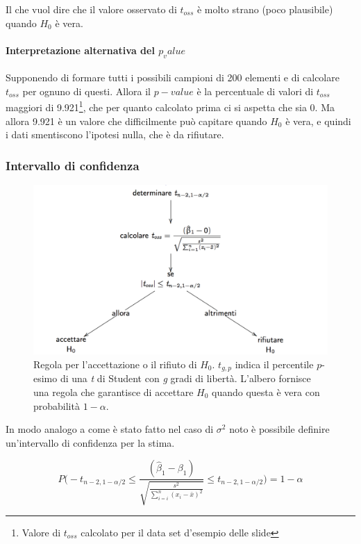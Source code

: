 Il che vuol dire che il valore osservato di $ t_{oss} $ è molto strano (poco plausibile) quando $ H_0 $ è vera.

\paragraph{Interpretazione alternativa del $ p_value $} Supponendo di formare tutti i possibili campioni di 200 elementi e di calcolare $ t_{oss} $ per ognuno di questi. Allora il $ p-value $ è la percentuale di valori di $ t_{oss} $ maggiori di 9.921\footnote{Valore di $ t_{oss} $ calcolato per il data set d'esempio delle slide}, che per quanto calcolato prima ci si aspetta che sia 0. Ma allora 9.921 è un valore che difficilmente può capitare quando $ H_0 $ è vera, e quindi i dati smentiscono l'ipotesi nulla, che è da rifiutare.

\subsubsection{Intervallo di confidenza}\label{intevallo-di-confidenza}

\begin{figure}[htbp]
\centering
\includegraphics[width=.9\textwidth]{./notes/immagini/l6-fig9-1.png}
\caption{Regola per l'accettazione o il rifiuto di $ H_0 $. $ t_{g,p} $ indica il percentile $ p $-esimo di una \textit{t} di Student con \textit{g} gradi di libertà. L'albero fornisce una regola che garantisce di accettare $ H_0 $ quando questa è vera con probabilità $ 1 - \alpha $.}
\end{figure}

In modo analogo a come è stato fatto nel caso di $ \sigma^2 $ noto è possibile definire un'intervallo di confidenza per la stima.

$$
P\Bigg( -t_{n-2, 1-\alpha/2} \leq \frac{(\hat{\beta}_1 - \beta_1)}{\sqrt{\frac{s^2}{\sum_{i=i}^{n} (x_i - \bar{x})^2}}}\leq  t_{n-2, 1-\alpha/2}\Bigg) = 1 - \alpha
$$

